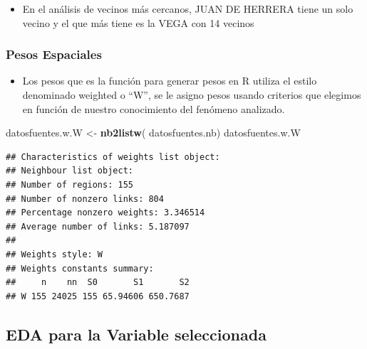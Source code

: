 \documentclass[11pt,]{article}
\newenvironment{Shaded}{\begin{snugshade}}{\end{snugshade}}
\newcommand{\KeywordTok}[1]{\textcolor[rgb]{0.13,0.29,0.53}{\textbf{#1}}}
\newcommand{\StringTok}[1]{\textcolor[rgb]{0.31,0.60,0.02}{#1}}
\newcommand{\NormalTok}[1]{#1}
\providecommand{\tightlist}{%
\setlength{\itemsep}{0pt}\setlength{\parskip}{0pt}}
\begin{document}
\begin{itemize}
\tightlist
\item
  En el análisis de vecinos más cercanos, JUAN DE HERRERA tiene un solo
  vecino y el que más tiene es la VEGA con 14 vecinos
\end{itemize}

\subsubsection{Pesos Espaciales}\label{pesos-espaciales}

\begin{itemize}
\tightlist
\item
  Los pesos que es la función para generar pesos en R utiliza el estilo
  denominado weighted o ``W'', se le asigno pesos usando criterios que
  elegimos en función de nuestro conocimiento del fenómeno analizado.
\end{itemize}

\begin{Shaded}
\begin{Highlighting}[]
\NormalTok{datosfuentes.w.W <-}\StringTok{ }\KeywordTok{nb2listw}\NormalTok{( datosfuentes.nb)}
\NormalTok{datosfuentes.w.W}
\end{Highlighting}
\end{Shaded}

\begin{verbatim}
## Characteristics of weights list object:
## Neighbour list object:
## Number of regions: 155 
## Number of nonzero links: 804 
## Percentage nonzero weights: 3.346514 
## Average number of links: 5.187097 
## 
## Weights style: W 
## Weights constants summary:
##     n    nn  S0       S1       S2
## W 155 24025 155 65.94606 650.7687
\end{verbatim}

\subsection{EDA para la Variable
seleccionada}\label{eda-para-la-variable-seleccionada}
\end{document}
